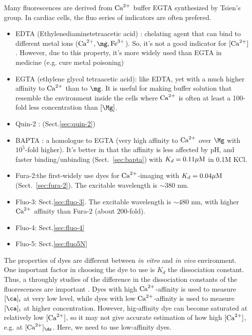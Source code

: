Many fluorescences are derived from ${\text{Ca}^{2+}}$ buffer EGTA synthesized by Tsien's
group.  In cardiac cells, the fluo series of indicators are often prefered.

  \begin{itemize}
  \item EDTA (Ethylenediaminetetraacetic acid) : chelating agent that
    can bind to different metal ions ($\Ca, \mg, \ce{Fe^3+}$). So, it's not a
    good indicator for $[{\text{Ca}^{2+}}]$. However, due to this property, it's more widely
    used than EGTA in medicine (e.g. cure metal poisoning)

  \item EGTA (ethylene glycol tetraacetic acid): like EDTA, yet with a
    much higher affinity to ${\text{Ca}^{2+}}$ than to $\mg$. It is useful for
    making buffer solution that resemble the environment inside the
    cells where ${\text{Ca}^{2+}}$ is often at least a 100-fold less concentration
    than $[\Mg]$.

  \item Quin-2 :  (Sect.\ref{sec:quin-2})

  \item BAPTA \citep{tsien1980}: a homologue to EGTA (very high affinity to
  ${\text{Ca}^{2+}}$ over $\Mg$ with $10^5$-fold higher). It's better in that the affinity is
  less affected by pH, and faster binding/unbinding (Sect.~\ref{sec:bapta}) with
  $K_d = 0.11{\mu\text{M}}$ in 0.1M KCl.

  \item Fura-2:the first-widely use dyes for ${\text{Ca}^{2+}}$-imaging
    with $K_d = 0.04{\mu\text{M}}$ (Sect.~\ref{sec:fura-2}). The excitable wavelength is
    $\sim 380$ nm.

  \item Fluo-3: Sect.\ref{sec:fluo-3}. The excitable wavelength is $\sim 480$
  nm, with higher ${\text{Ca}^{2+}}$ affinity than Fura-2 (about 200-fold).

  \item Fluo-4: Sect.\ref{sec:fluo-4}

  \item Fluo-5: Sect.\ref{sec:fluo5N}

  \end{itemize}

The properties of dyes are different between {\it in vitro} and {\it in vivo}
environment. One important factor in choosing the dye to use is $K_d$ the
dissociation constant. Thus, a throughly studies of the difference in the
dissociation constants of the fluorescences are important \citep{hagen2012}.
Dyes with high ${\text{Ca}^{2+}}$-affinity is used to measure $[\ca]_i$ at very low level,
while dyes with low ${\text{Ca}^{2+}}$-affinity is used to measure $[\ca]_i$ at higher
concentration. However, hig-affinity dye can become saturated at relatively low
$[{\text{Ca}^{2+}}]$, so it may not give accurate estimation of how high $[{\text{Ca}^{2+}}]$, e.g. at
$[\Ca]_\ds$. Here, we need to use low-affinity dyes.

